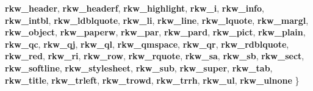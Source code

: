 \begin{DoxyCompactItemize}
\newline
{\bfseries rkw\+\_\+header}, 
{\bfseries rkw\+\_\+headerf}, 
{\bfseries rkw\+\_\+highlight}, 
{\bfseries rkw\+\_\+i}, 
\newline
{\bfseries rkw\+\_\+info}, 
{\bfseries rkw\+\_\+intbl}, 
{\bfseries rkw\+\_\+ldblquote}, 
{\bfseries rkw\+\_\+li}, 
\newline
{\bfseries rkw\+\_\+line}, 
{\bfseries rkw\+\_\+lquote}, 
{\bfseries rkw\+\_\+margl}, 
{\bfseries rkw\+\_\+object}, 
\newline
{\bfseries rkw\+\_\+paperw}, 
{\bfseries rkw\+\_\+par}, 
{\bfseries rkw\+\_\+pard}, 
{\bfseries rkw\+\_\+pict}, 
\newline
{\bfseries rkw\+\_\+plain}, 
{\bfseries rkw\+\_\+qc}, 
{\bfseries rkw\+\_\+qj}, 
{\bfseries rkw\+\_\+ql}, 
\newline
{\bfseries rkw\+\_\+qmspace}, 
{\bfseries rkw\+\_\+qr}, 
{\bfseries rkw\+\_\+rdblquote}, 
{\bfseries rkw\+\_\+red}, 
\newline
{\bfseries rkw\+\_\+ri}, 
{\bfseries rkw\+\_\+row}, 
{\bfseries rkw\+\_\+rquote}, 
{\bfseries rkw\+\_\+sa}, 
\newline
{\bfseries rkw\+\_\+sb}, 
{\bfseries rkw\+\_\+sect}, 
{\bfseries rkw\+\_\+softline}, 
{\bfseries rkw\+\_\+stylesheet}, 
\newline
{\bfseries rkw\+\_\+sub}, 
{\bfseries rkw\+\_\+super}, 
{\bfseries rkw\+\_\+tab}, 
{\bfseries rkw\+\_\+title}, 
\newline
{\bfseries rkw\+\_\+trleft}, 
{\bfseries rkw\+\_\+trowd}, 
{\bfseries rkw\+\_\+trrh}, 
{\bfseries rkw\+\_\+ul}, 
\newline
{\bfseries rkw\+\_\+ulnone}
 \}
\end{DoxyCompactItemize}

